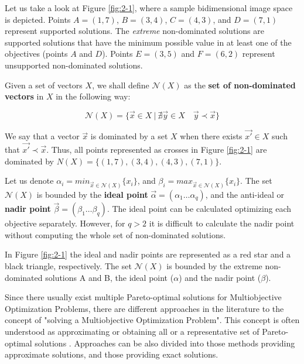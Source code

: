 Let us take a look at Figure \ref{fig:2-1}, where a sample bidimensional image space is depicted. Points $A=(1,7)$, $B=(3,4)$, $C=(4,3)$,  and $D=(7,1)$ represent supported solutions. The \textit{extreme} non-dominated solutions are supported solutions that have the minimum possible value in at least one of the objectives (points $A$ and $D$). Points $E=(3,5)$ and $F=(6,2)$ represent unsupported non-dominated solutions. 

\begin{defi}\label{chapMultiObjAlg:def:nondom}
Given a set of vectors $X$, we shall define $\mathcal{N}(X)$ as the \textbf{set of non-dominated vectors} in $X$ in the following way:

\begin{equation}
  \mathcal{N}(X) = \{\vec x \in X \  | \  \nexists \vec y \in X \quad \vec y \prec \vec x\}
\end{equation}

\end{defi}

\begin{defi}
We say that a vector $\vec x$ is dominated by a set $X$ when 
there exists $\vec{x'}\in X$ such that $\vec{x'} \prec \vec x$. Thus, all points represented as crosses in Figure \ref{fig:2-1} are dominated by ${N}(X) = \{ (1,7) , (3,4), (4,3), (7,1) \}$.
\end{defi}

\begin{defi}\label{chapMultiObjAlg:def:idealnadir}
Let us denote $\alpha_i = min_{\vec x \in \mathcal{N}(X)}\{x_i\}$, and
$\beta_i = max_{\vec x \in \mathcal{N}(X)}\{x_i\}$. The set $\mathcal{N}(X)$ is bounded by the \textbf{ideal point} $\vec \alpha = (\alpha_1 \ldots \alpha_q)$,
and the anti-ideal or \textbf{nadir point} $\vec \beta = (\beta_1 \ldots \beta_q)$. The ideal point can be calculated optimizing each objective separately. However, for $q > 2$ it is difficult to calculate the nadir point without computing the whole set of non-dominated solutions. 
\end{defi}

In Figure \ref{fig:2-1} the ideal and nadir points are represented as a red star and a black triangle, respectively. The set $\mathcal{N}(X)$ is bounded by the extreme non-dominated solutions A and B, the ideal point ($\alpha$) and the nadir point ($\beta$).

Since there usually exist multiple Pareto-optimal solutions for Multiobjective Optimization Problems, there are different approaches in the literature to the concept of "solving a Multiobjective Optimization Problem". This concept is often understood as approximating or obtaining all or a representative set of Pareto-optimal solutions \citep{ehrgott2005}. Approaches can be also divided into those methods providing approximate solutions, and those providing exact solutions. 

